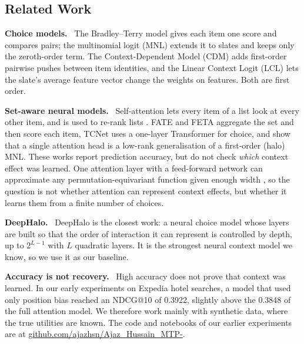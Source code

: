 \documentclass[11pt,a4paper]{article}
\numberwithin{table}{section}
\numberwithin{figure}{section}
\numberwithin{equation}{section}
\newcommand{\para}[1]{\textbf{#1}\ }
\begin{document}
\subsection{Related Work}
\para{Choice models.} The Bradley--Terry model \citep{bradley1952} gives each item one score and compares pairs; the multinomial logit (MNL) \citep{mcfadden1974} extends it to slates and keeps only the zeroth-order term. The Context-Dependent Model (CDM) \citep{seshadri2019} adds first-order pairwise pushes between item identities, and the Linear Context Logit (LCL) \citep{tomlinson2021} lets the slate's average feature vector change the weights on features. Both are first order.

\para{Set-aware neural models.} Self-attention \citep{vaswani2017} lets every item of a list look at every other item, and is used to re-rank lists \citep{pobrotyn2020}. FATE and FETA \citep{pfannschmidt2022} aggregate the set and then score each item, TCNet \citep{wang2023tcnet} uses a one-layer Transformer for choice, and \citet{ko2023} show that a single attention head is a low-rank generalisation of a first-order (halo) MNL. These works report prediction accuracy, but do not check \emph{which} context effect was learned. One attention layer with a feed-forward network can approximate any permutation-equivariant function given enough width \citep{kajitsuka2024}, so the question is not whether attention can represent context effects, but whether it learns them from a finite number of choices.

\para{DeepHalo.} DeepHalo \citep{zhang2025} is the closest work: a neural choice model whose layers are built so that the order of interaction it can represent is controlled by depth, up to $2^{L-1}$ with $L$ quadratic layers. It is the strongest neural context model we know, so we use it as our baseline.

\para{Accuracy is not recovery.} High accuracy does not prove that context was learned. In our early experiments on Expedia hotel searches, a model that used only position bias reached an NDCG@10 of 0.3922, slightly above the 0.3848 of the full attention model. We therefore work mainly with synthetic data, where the true utilities are known. The code and notebooks of our earlier experiments are at \href{https://github.com/ajazhsn/Ajaz_Hussain_MTP-}{github.com/ajazhsn/Ajaz\_Hussain\_MTP-}.
\end{document}
